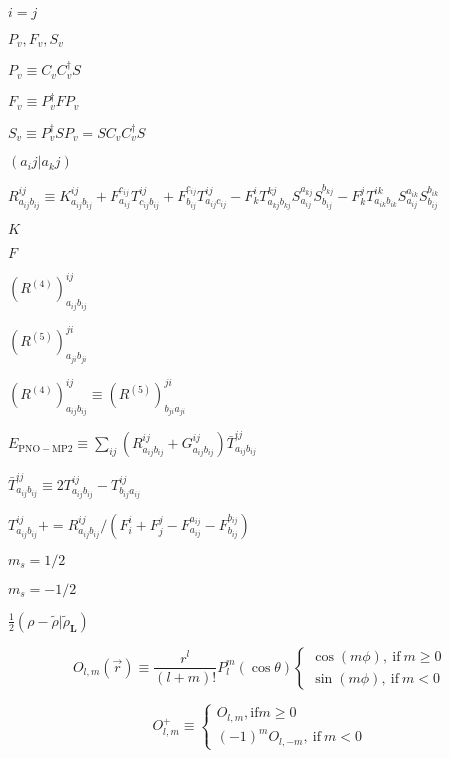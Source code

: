 \documentclass{article}
\begin{document}
$ i=j $
\pagebreak

$ {P_v, F_v, S_v} $
\pagebreak

$ P_v \equiv C_v C_v^\dagger S $
\pagebreak

$ F_v \equiv P_v^\dagger F P_v $
\pagebreak

$ S_v \equiv P_v^\dagger S P_v = S C_v C_v^\dagger S $
\pagebreak

$ (a_ij|a_kj) $
\pagebreak

$ R^{ij}_{a_{ij} b_{ij}} \equiv K^{ij}_{a_{ij} b_{ij}} + F^{c_{ij}}_{a_{ij}} T^{ij}_{c_{ij} b_{ij}} + F^{c_{ij}}_{b_{ij}} T^{ij}_{a_{ij} c_{ij}} - F^i_k T^{kj}_{a_{kj} b_{kj}} S^{a_{kj}}_{a_{ij}} S^{b_{kj}}_{b_{ij}} - F^j_k T^{ik}_{a_{ik} b_{ik}} S^{a_{ik}}_{a_{ij}} S^{b_{ik}}_{b_{ij}} $
\pagebreak

$ K $
\pagebreak

$ F $
\pagebreak

$ \left(R^{(4)}\right)^{ij}_{a_{ij} b_{ij}} $
\pagebreak

$ \left(R^{(5)}\right)^{ji}_{a_{ji} b_{ji}} $
\pagebreak

$ \left(R^{(4)}\right)^{ij}_{a_{ij} b_{ij}} \equiv \left(R^{(5)}\right)^{ji}_{b_{ji} a_{ji}} $
\pagebreak

$ E_\mathrm{PNO-MP2} \equiv \sum_{ij} \left( R^{ij}_{a_{ij} b_{ij}} + G^{ij}_{a_{ij} b_{ij}} \right) \bar{T}^{ij}_{a_{ij} b_{ij}} $
\pagebreak

$ \bar{T}^{ij}_{a_{ij} b_{ij}} \equiv 2 T^{ij}_{a_{ij} b_{ij}} - T^{ij}_{b_{ij} a_{ij}} $
\pagebreak

$ T^{ij}_{a_{ij} b_{ij}} += R^{ij}_{a_{ij} b_{ij}} / (F^i_i + F^j_j - F^{a_{ij}}_{a_{ij}} - F^{b_{ij}}_{b_{ij}}) $
\pagebreak

$ m_s = 1/2 $
\pagebreak

$ m_s = -1/2 $
\pagebreak

$ \frac{1}{2} (\rho - \tilde{\rho}|\tilde{\rho}_\mathbf{L}) $
\pagebreak

\[ O_{l,m}(\vec{r}) \equiv \frac{r^l}{(l+m)!} P^m_l(\cos\theta) \begin{cases} \cos(m\phi)\mathrm{,\ if\ } m \geq 0 \\ \sin(m\phi)\mathrm{,\ if\ } m < 0 \end{cases} \]
\pagebreak

\[ O^+_{l,m} \equiv \begin{cases} O_{l,m} \mathrm{, if} m \geq 0 \\ (-1)^m O_{l,-m} \mathrm{,\ if\ } m < 0 \end{cases} \]
\pagebreak
\end{document}
